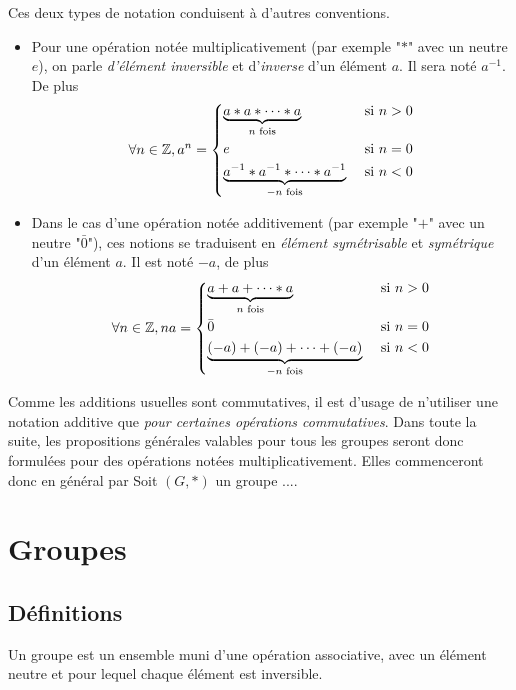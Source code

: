 Ces deux types de notation conduisent à d'autres conventions.
\begin{itemize}
 \item Pour une opération notée multiplicativement (par exemple "$*$" avec un neutre $e$), on parle \emph{d'élément inversible} et d'\emph{inverse} d'un élément $a$. Il sera noté $a^{-1}$. De plus
\begin{displaymath}
 \forall n \in \mathbb{Z},
a^n = 
\left\lbrace 
\begin{aligned}
 &\underset{n \text{ fois} }{\underbrace{a * a * \cdots *a}}&\text{ si } n>0 \\
 &e &\text{ si } n=0 \\
 &\underset{-n \text{ fois} }{\underbrace{a^{-1} * a^{-1} * \cdots *a^{-1}}}&\text{ si } n<0
\end{aligned}
\right. 
\end{displaymath}

 \item Dans le cas d'une opération notée additivement (par exemple "$+$" avec un neutre "$\bar0$"), ces notions se traduisent en \emph{élément symétrisable} et \emph{symétrique} d'un élément $a$. Il est noté $-a$, de plus
\begin{displaymath}
 \forall n \in \mathbb{Z},
na = 
\left\lbrace 
\begin{aligned}
 &\underset{n \text{ fois} }{\underbrace{a + a + \cdots *a}}&\text{ si } n>0 \\
 &\bar 0 &\text{ si } n=0 \\
 &\underset{-n \text{ fois} }{\underbrace{(-a)+ (-a) + \cdots +(-a)}}&\text{ si } n<0
\end{aligned}
\right. 
\end{displaymath}
\end{itemize}

\begin{rem}
Comme les additions usuelles sont commutatives, il est d'usage de n'utiliser une notation additive que \emph{pour certaines opérations commutatives}. Dans toute la suite, les propositions générales valables pour tous les groupes seront donc formulées pour des opérations notées multiplicativement. Elles commenceront donc en général par \og Soit $(G,*)$ un groupe ...\fg.
\end{rem}


\section{Groupes}
\subsection{Définitions }
\begin{defi}
 Un groupe est un ensemble muni d'une opération associative, avec un élément neutre et pour lequel chaque élément est inversible.
\end{defi}

